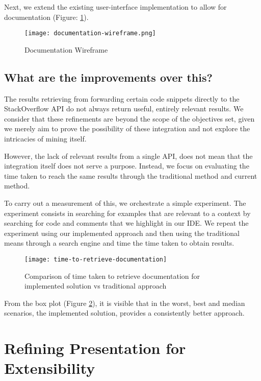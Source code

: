 Next, we extend the existing user-interface implementation to allow for documentation (Figure: \ref{fig:documentationWireframe}).

\begin{figure}[h!]
	\centering
	\texttt{[image: documentation-wireframe.png]}
	\caption{Documentation Wireframe}
	\label{fig:documentationWireframe}
\end{figure}

\subsection{What are the improvements over this?}

The results retrieving from forwarding certain code snippets directly to the StackOverflow API do not always return useful, entirely relevant results. We consider that these refinements are beyond the scope of the objectives set, given we merely aim to prove the possibility of these integration and not explore the intricacies of mining itself.

However, the lack of relevant results from a single API, does not mean that the integration itself does not serve a purpose. Instead, we focus on evaluating the time taken to reach the same results through the traditional method and current method.

To carry out a measurement of this, we orchestrate a simple experiment. The experiment consists in searching for examples that are relevant to a context by searching for code and comments that we highlight in our IDE. We repeat the experiment using our implemented approach and then using the traditional means through a search engine and time the time taken to obtain results.

\begin{figure}[h]
	\centering
	\texttt{[image: time-to-retrieve-documentation]}
	\caption{Comparison of time taken to retrieve documentation for implemented solution vs traditional approach}
	\label{fig:time-to-retrieve-documentation}
\end{figure}

From the box plot (Figure \ref{fig:time-to-retrieve-documentation}), it is visible that in the worst, best and median scenarios, the implemented solution, provides a consistently better approach.

\section{Refining Presentation for Extensibility}

